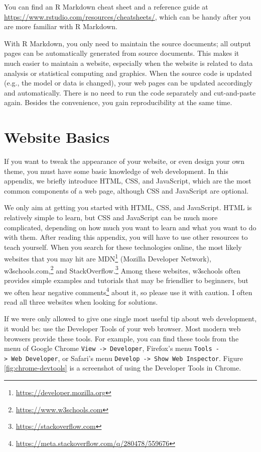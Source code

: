 \documentclass[12pt,]{krantz}
\renewcommand{\href}[2]{#2\footnote{\url{#1}}}
\theoremstyle{definition}
\theoremstyle{definition}
\theoremstyle{definition}
\theoremstyle{remark}
\begin{document}
You can find an R Markdown cheat sheet and a reference guide at
\url{https://www.rstudio.com/resources/cheatsheets/}, which can be handy
after you are more familiar with R Markdown.

With R Markdown, you only need to maintain the source documents; all
output pages can be automatically generated from source documents. This
makes it much easier to maintain a website, especially when the website
is related to data analysis or statistical computing and graphics. When
the source code is updated (e.g., the model or data is changed), your
web pages can be updated accordingly and automatically. There is no need
to run the code separately and cut-and-paste again. Besides the
convenience, you gain reproducibility at the same time.

\hypertarget{website-basics}{%
\chapter{Website Basics}\label{website-basics}}

If you want to tweak the appearance of your website, or even design your
own theme, you must have some basic knowledge of web development. In
this appendix, we briefly introduce HTML, CSS, and JavaScript, which are
the most common components of a web page, although CSS and JavaScript
are optional.

We only aim at getting you started with HTML, CSS, and JavaScript. HTML
is relatively simple to learn, but CSS and JavaScript can be much more
complicated, depending on how much you want to learn and what you want
to do with them. After reading this appendix, you will have to use other
resources to teach yourself. When you search for these technologies
online, the most likely websites that you may hit are
\href{https://developer.mozilla.org}{MDN} (Mozilla Developer Network),
\href{https://www.w3schools.com}{w3schools.com,} and
\href{https://stackoverflow.com}{StackOverflow.} Among these websites,
w3schools often provides simple examples and tutorials that may be
friendlier to beginners, but we often hear
\href{https://meta.stackoverflow.com/q/280478/559676}{negative comments}
about it, so please use it with caution. I often read all three websites
when looking for solutions.

If we were only allowed to give one single most useful tip about web
development, it would be: use the Developer Tools of your web browser.
Most modern web browsers provide these tools. For example, you can find
these tools from the menu of Google Chrome
\texttt{View\ -\textgreater{}\ Developer}, Firefox's menu
\texttt{Tools\ -\textgreater{}\ Web\ Developer}, or Safari's menu
\texttt{Develop\ -\textgreater{}\ Show\ Web\ Inspector}. Figure
\ref{fig:chrome-devtools} is a screenshot of using the Developer Tools
in Chrome.
\end{document}
